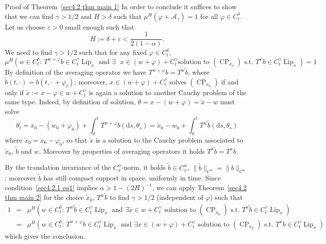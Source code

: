 \documentclass[10pt]{article}
\newcommand{\assign}{:=}
\newcommand{\mathd}{\mathrm{d}}
\newcommand{\tmop}[1]{\ensuremath{\operatorname{#1}}}
\newenvironment{proof*}[1]{\noindent\textbf{#1\ }}{\hspace*{\fill}$\Box$\medskip}
\begin{document}
\begin{proof*}{Proof of Theorem~\ref{sec4.2 thm main 1}}
  In order to conclude it suffices to show that we can find $\gamma > 1 / 2$
  and $H > \delta$ such that $\mu^H (\varphi + \mathcal{A}_{\gamma}) = 1$ for
  all $\varphi \in C_t^{\delta}$. Let us choose $\varepsilon > 0$ small enough
  such that
  \begin{equation}
    H \assign \delta + \varepsilon < \frac{1}{2 (1 - \alpha)} \label{sec4.2.1
    eq1} .
  \end{equation}
  We need to find $\gamma > 1 / 2$ such that for any fixed $\varphi \in
  C_t^{\delta}$,
  \[ \mu^H \left( w \in C_t^{\delta} : \, T^{w + \varphi} b \in C^{\gamma}_t
     \tmop{Lip}_x \text{ and $\exists$ $x \in (w + \varphi) + C_t^{\gamma}$
     solution to $(\tmop{CP}_{x_0})$ s.t. } T^x b \in C^{\gamma}_t
     \tmop{Lip}_x \right) = 1 \]
  By definition of the averaging operator we have $T^{w + \varphi} b = T^w
  \tilde{b}$, where $\tilde{b} (t, \cdot) = b \left( t, \cdot \, + \varphi_t
  \right)$; moreover, $x \in (w + \varphi) + C_t^{\gamma}$ solves
  $(\tmop{CP}_{x_0})$ if and only if $\tilde{x} \assign x - \varphi \in w +
  C_t^{\gamma}$ is again a solution to another Cauchy problem of the same
  type. Indeed, by definition of solution, $\theta = x - (w + \varphi) =
  \tilde{x} - w$ must solve
  \[ \theta_t = x_0 - (w_0 + \varphi_0) + \int_0^t T^{w + \varphi} b (\mathd
     s, \theta_s) = \tilde{x}_0 - w_0 + \int_0^t T^w \tilde{b} (\mathd s,
     \theta_s) \]
  where $\tilde{x}_0 = x_0 - \varphi_0$, so that $\tilde{x}$ is a solution to
  the Cauchy problem associated to $\tilde{x}_0$, $\tilde{b}$ and $w$.
  Moreover by properties of averaging operators it holds $T^{\tilde{x}}
  \tilde{b} = T^x b$.
  
  By the translation invariance of the $C^{\alpha}_x$-norm, it holds
  $\tilde{b} \in C^{\alpha}_x$, $\| \tilde{b} \|_{C^{\alpha}} = \| b
  \|_{C^{\alpha}}$; moreover $\tilde{b}$ has still compact support in space,
  uniformly in time. Since condition~{\eqref{sec4.2.1 eq1}} implies $\alpha >
  1 - (2 H)^{- 1}$, we can apply Theorem~\ref{sec4.2 thm main 2} for the
  choice $\tilde{x}_0$, $T^w \tilde{b}$ to find $\gamma > 1 / 2$ (independent
  of $\varphi$) such that
  \begin{eqnarray*}
    1 & = & \mu^H \left( w \in C_t^{\delta} : \, T^w \tilde{b} \in
    C^{\gamma}_t \tmop{Lip}_x \text{ and $\exists \tilde{x} \in w +
    C_t^{\gamma}$ solution to $(\tmop{CP}_{\tilde{x}_0})$ s.t. } T^{\tilde{x}}
    \tilde{b} \in C^{\gamma}_t \tmop{Lip}_x \right)\\
    & = & \mu^H \left( w \in C_t^{\delta} : \, T^{w + \varphi} b \in
    C^{\gamma}_t \tmop{Lip}_x \text{ and $\exists x \in (w + \varphi) +
    C_t^{\gamma}$ solution to $(\tmop{CP}_{x_0})$ s.t. } T^x b \in
    C^{\gamma}_t \tmop{Lip}_x \right)
  \end{eqnarray*}
  which gives the conclusion.
\end{proof*}
\end{document}
